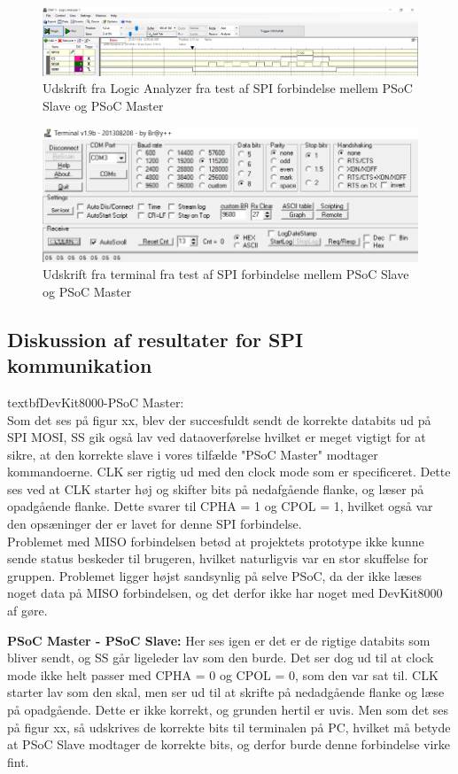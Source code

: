 \begin{figure}[H]
\includegraphics[scale=0.6]{tex/TeImRe/SPI/Logic_analyzer}
\caption{Udskrift fra Logic Analyzer fra test af SPI forbindelse mellem PSoC Slave og PSoC Master}
\end{figure}

\begin{figure}[H]
\includegraphics[scale=0.6]{tex/TeImRe/SPI/Terminal_spi_slave}
\caption{Udskrift fra terminal fra test af SPI forbindelse mellem PSoC Slave og PSoC Master}
\end{figure}

\subsection{Diskussion af resultater for SPI kommunikation}
textbf{DevKit8000-PSoC Master:}\\
Som det ses på figur xx, blev der succesfuldt sendt de korrekte databits ud på SPI MOSI, SS gik også lav ved dataoverførelse hvilket er meget vigtigt
for at sikre, at den korrekte slave i vores tilfælde "PSoC Master" modtager kommandoerne. CLK ser rigtig ud med den clock mode som er specificeret.
Dette ses ved at CLK starter høj og skifter bits på nedafgående flanke, og læser på opadgående flanke. Dette svarer til CPHA = 1 og CPOL = 1, hvilket også var 
den opsæninger der er lavet for denne SPI forbindelse.\\

Problemet med MISO forbindelsen betød at projektets prototype ikke kunne sende status beskeder til brugeren, hvilket naturligvis var en stor skuffelse for
gruppen. Problemet ligger højst sandsynlig på selve PSoC, da der ikke læses noget data på MISO forbindelsen, og det derfor ikke har noget med DevKit8000 af gøre.


\textbf{PSoC Master - PSoC Slave:} 
Her ses igen er det er de rigtige databits som bliver sendt, og SS går ligeleder lav som den burde. Det ser dog ud til at clock mode ikke helt passer med
CPHA = 0 og CPOL = 0, som den var sat til. CLK starter lav som den skal, men ser ud til at skrifte på nedadgående flanke og læse på opadgående. Dette
er ikke korrekt, og grunden hertil er uvis. Men som det ses på figur xx, så udskrives de korrekte bits til terminalen på PC, hvilket må betyde at 
PSoC Slave modtager de korrekte bits, og derfor burde denne forbindelse virke fint.\\ 

